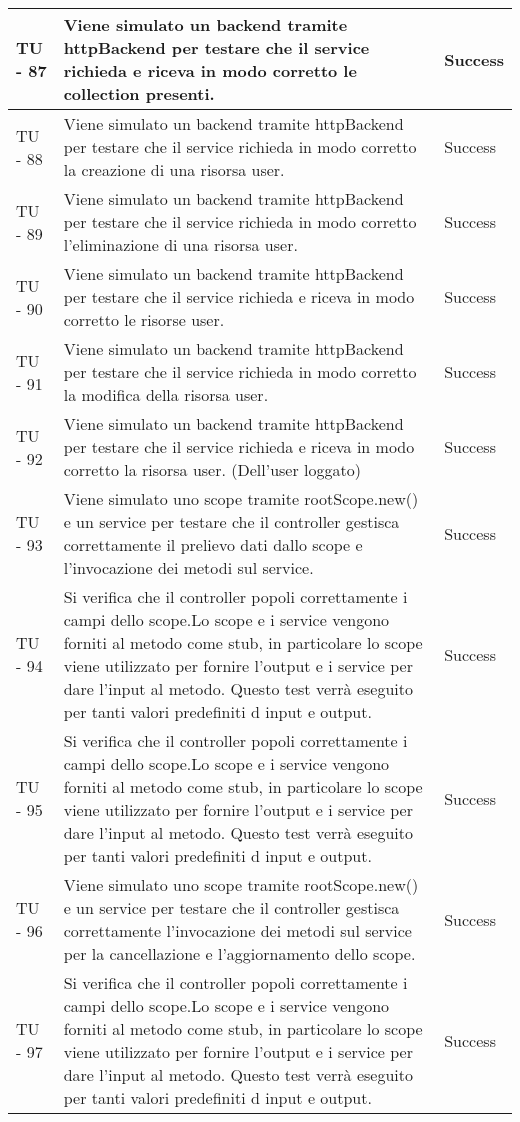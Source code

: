 \begin{center}
\begin{longtable}{ | p{3cm} | p{9cm} | p{2cm} | }
TU - 87 & Viene simulato un backend tramite httpBackend per testare che il service richieda e riceva in modo corretto le collection presenti. & Success \\ \hline
TU - 88 & Viene simulato un backend tramite httpBackend per testare che il service richieda in modo corretto la creazione di una risorsa user. & Success \\ \hline
TU - 89 & Viene simulato un backend tramite httpBackend per testare che il service richieda in modo corretto l'eliminazione di una risorsa user. & Success \\ \hline
TU - 90 & Viene simulato un backend tramite httpBackend per testare che il service richieda e riceva in modo corretto le risorse user. & Success \\ \hline
TU - 91 & Viene simulato un backend tramite httpBackend per testare che il service richieda in modo corretto la modifica della risorsa user. & Success \\ \hline
TU - 92 & Viene simulato un backend tramite httpBackend per testare che il service richieda e riceva in modo corretto la risorsa user. (Dell'user loggato) & Success \\ \hline
TU - 93 & Viene simulato uno scope tramite rootScope.new() e un service per testare che il controller gestisca correttamente il prelievo dati dallo scope e l'invocazione dei metodi sul service. & Success \\ \hline
TU - 94 & Si verifica che il controller popoli correttamente i campi dello scope.Lo scope e i service vengono forniti al metodo come stub, in particolare lo scope viene utilizzato per fornire l'output e i service per dare l'input al metodo. Questo test verrà eseguito per tanti valori predefiniti d input e output. & Success \\ \hline
TU - 95 & Si verifica che il controller popoli correttamente i campi dello scope.Lo scope e i service vengono forniti al metodo come stub, in particolare lo scope viene utilizzato per fornire l'output e i service per dare l'input al metodo. Questo test verrà eseguito per tanti valori predefiniti d input e output. & Success \\ \hline
TU - 96 & Viene simulato uno scope tramite rootScope.new() e un service per testare che il controller gestisca correttamente l'invocazione dei metodi sul service per la cancellazione e l'aggiornamento dello scope. & Success \\ \hline
TU - 97 & Si verifica che il controller popoli correttamente i campi dello scope.Lo scope e i service vengono forniti al metodo come stub, in particolare lo scope viene utilizzato per fornire l'output e i service per dare l'input al metodo. Questo test verrà eseguito per tanti valori predefiniti d input e output. & Success \\ \hline

\end{longtable}
\end{center}
